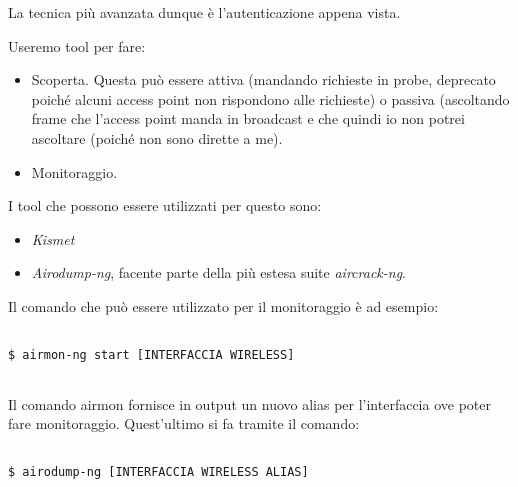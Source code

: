 \documentclass[14pt]{extreport}
\begin{document}
La tecnica più avanzata dunque è l'autenticazione appena vista.

Useremo tool per fare:

\begin{itemize}
    \item Scoperta. Questa può essere attiva (mandando richieste in probe, deprecato poiché alcuni access point non rispondono alle richieste) o passiva (ascoltando frame che l'access point manda in broadcast e che quindi io non potrei ascoltare (poiché non sono dirette a me). 
    
    \item Monitoraggio.

\end{itemize}

I tool che possono essere utilizzati per questo sono:

\begin{itemize}
    \item \textit{Kismet}
    
    
    \item \textit{Airodump-ng}, facente parte della più estesa suite \textit{aircrack-ng}.
\end{itemize}



Il comando che può essere utilizzato per il monitoraggio è ad esempio:

\vspace{5pt}

{
\small
\begin{tcolorbox}

\begin{verbatim}

$ airmon-ng start [INTERFACCIA WIRELESS]
  
\end{verbatim}

\end{tcolorbox}
}

\vspace{5pt}


Il comando airmon fornisce in output un nuovo alias per l'interfaccia ove poter fare monitoraggio. Quest'ultimo si fa tramite il comando:


\vspace{5pt}

{
\small
\begin{tcolorbox}

\begin{verbatim}

$ airodump-ng [INTERFACCIA WIRELESS ALIAS]
  
\end{verbatim}

\end{tcolorbox}
}
\end{document}

